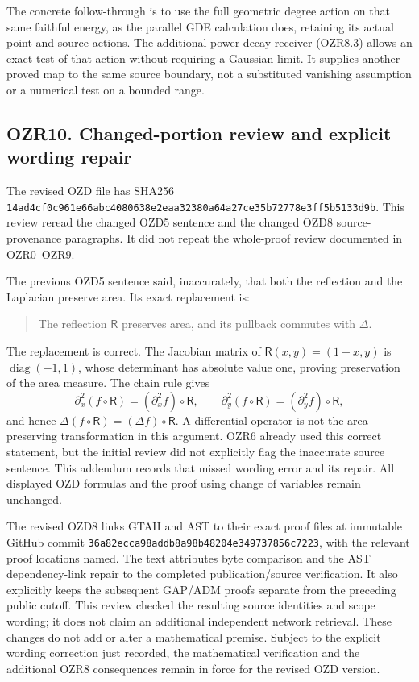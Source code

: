 The concrete follow-through is to use the full geometric degree action
on that same faithful energy, as the parallel GDE calculation does,
retaining its actual point and source actions. The additional
power-decay receiver (OZR8.3) allows an exact test of that action
without requiring a Gaussian limit. It supplies another proved map to
the same source boundary, not a substituted vanishing assumption or a
numerical test on a bounded range.

\subsection{OZR10. Changed-portion review and explicit wording
repair}\label{ozr10.-changed-portion-review-and-explicit-wording-repair}

The revised OZD file has SHA256
\texttt{14ad4cf0c961e66abc4080638e2eaa32380a64a27ce35b72778e3ff5b5133d9b}.
This review reread the changed OZD5 sentence and the changed OZD8
source-provenance paragraphs. It did not repeat the whole-proof review
documented in OZR0--OZR9.

The previous OZD5 sentence said, inaccurately, that both the reflection
and the Laplacian preserve area. Its exact replacement is:

\begin{quote}
The reflection \(\mathsf R\) preserves area, and its pullback commutes
with \(\Delta\).
\end{quote}

The replacement is correct. The Jacobian matrix of
\(\mathsf R(x,y)=(1-x,y)\) is \(\operatorname{diag}(-1,1)\), whose
determinant has absolute value one, proving preservation of the area
measure. The chain rule gives \[
\partial_x^2(f\circ\mathsf R)=(\partial_x^2f)\circ\mathsf R,
\qquad
\partial_y^2(f\circ\mathsf R)=(\partial_y^2f)\circ\mathsf R,
\] and hence \(\Delta(f\circ\mathsf R)=(\Delta f)\circ\mathsf R\). A
differential operator is not the area-preserving transformation in this
argument. OZR6 already used this correct statement, but the initial
review did not explicitly flag the inaccurate source sentence. This
addendum records that missed wording error and its repair. All displayed
OZD formulas and the proof using change of variables remain unchanged.

The revised OZD8 links GTAH and AST to their exact proof files at
immutable GitHub commit
\texttt{36a82ecca98addb8a98b48204e349737856c7223}, with the relevant
proof locations named. The text attributes byte comparison and the AST
dependency-link repair to the completed publication/source verification.
It also explicitly keeps the subsequent GAP/ADM proofs separate from the
preceding public cutoff. This review checked the resulting source
identities and scope wording; it does not claim an additional
independent network retrieval. These changes do not add or alter a
mathematical premise. Subject to the explicit wording correction just
recorded, the mathematical verification and the additional OZR8
consequences remain in force for the revised OZD version.


